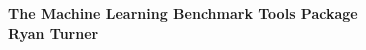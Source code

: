 \documentclass[a0,landscape]{a0poster}
\begin{document}


\begin{centering}{\fontsize{100}{120} \selectfont \color{NavyBlue} \textbf{The Machine Learning Benchmark Tools Package} \color{Black}}\\ %
\Huge \textbf{Ryan Turner}\\ %
\end{centering}

\vspace{1cm} %

\end{document}
